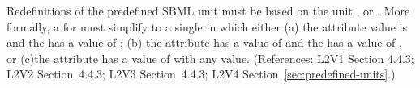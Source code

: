 Redefinitions of the predefined SBML unit  must be based on
the unit ,  or .
More formally, a \UnitDefinition for  must simplify to a
single \Unit in which either (a) the 
attribute value is  and the  has a value of
; (b) the  attribute has a value of
 and the  has a value of , or (c)the
 attribute has a value of  with
any  value.  (References: L2V1 Section 4.4.3; L2V2
Section~4.4.3; L2V3 Section~4.4.3; L2V4 Section~\ref{sec:predefined-units}.)
